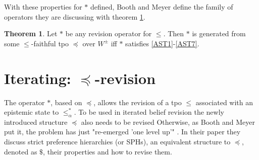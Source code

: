 \documentclass[english, 12pt]{scrartcl}
\theoremstyle{definition}
\theoremstyle{definition}
\theoremstyle{definition}
\newtheorem{theorem}{Theorem}
\begin{document}
\bigskip

With these properties for $\ast$ defined, Booth and Meyer define the family of operators they are discussing with theorem \ref{theorem:revision-operator}.


\begin{theorem}
\label{theorem:revision-operator}Let $\ast$ be any revision operator for $\leq$. Then $\ast$ is generated from some $\leq$-faithful tpo $\preceq$ over $W^{\pm}$ iff $\ast$ satisfies \ref{AST1}-\ref{AST7}. \cite{Booth2011}
\end{theorem}



\section{Iterating: $\preceq$-revision}

The operator $\ast$, based on $\preceq$, allows the revision of a tpo $\leq$ associated with an epistemic state to $\leq_{\alpha}^{\ast}$. To be used in iterated belief revision the newly introduced structure $\preceq$ also needs to be revised Otherwise, as Booth and Meyer put it, the problem has just "re-emerged 'one level up'" \cite{Booth2011}. In their paper they discuss strict preference hierarchies (or SPHs), an equivalent structure to $\preceq$, denoted as $\$$, their properties and how to revise them.
\end{document}
